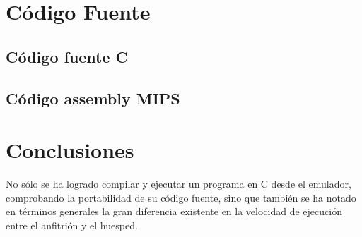 \documentclass{article}
\begin{document}
\section{C\'odigo Fuente}
\subsection{C\'odigo fuente C}

\subsection{C\'odigo assembly MIPS}


\section{Conclusiones}
No s\'olo se ha logrado compilar y ejecutar un programa en C desde el emulador, comprobando la portabilidad de su c\'odigo fuente, sino que tambi\'en se ha notado en t\'erminos generales la gran diferencia existente en la velocidad de ejecuci\'on entre el anfitri\'on y el huesped.
\end{document}
